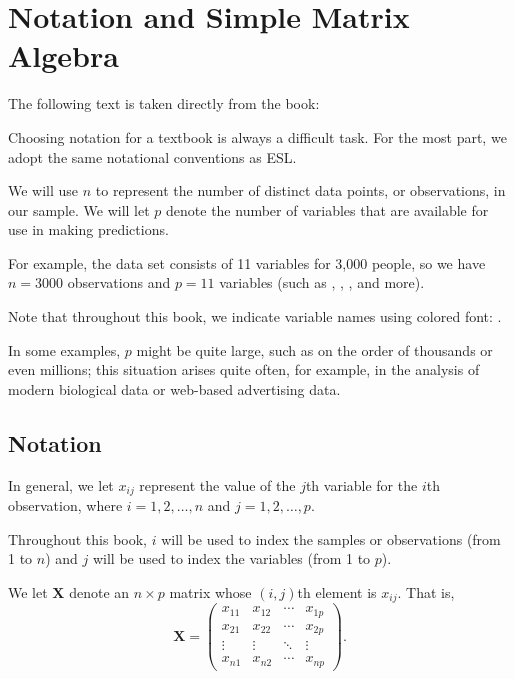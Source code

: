 \section{Notation and Simple Matrix Algebra}
\label{sec:notation}

The following text is taken directly from the book:

Choosing notation for a textbook is always a difficult task. For the most part, we adopt the same notational conventions as ESL. 

We will use \( n \) to represent the number of distinct data points, or observations, in our sample. We will let \( p \) denote the number of variables that are available for use in making predictions. 

For example, the  data set consists of 11 variables for 3,000 people, so we have \( n = 3000 \) observations and \( p = 11 \) variables (such as , , , and more). 

Note that throughout this book, we indicate variable names using colored font: .

In some examples, \( p \) might be quite large, such as on the order of thousands or even millions; this situation arises quite often, for example, in the analysis of modern biological data or web-based advertising data.

\subsection{Notation}

In general, we let \( x_{ij} \) represent the value of the \( j \)th variable for the \( i \)th observation, where \( i = 1, 2, \ldots, n \) and \( j = 1, 2, \ldots, p \). 

Throughout this book, \( i \) will be used to index the samples or observations (from 1 to \( n \)) and \( j \) will be used to index the variables (from 1 to \( p \)).

We let \( \mathbf{X} \) denote an \( n \times p \) matrix whose \( (i,j) \)th element is \( x_{ij} \). That is,
\[
\mathbf{X} = 
\begin{pmatrix}
x_{11} & x_{12} & \cdots & x_{1p} \\
x_{21} & x_{22} & \cdots & x_{2p} \\
\vdots & \vdots & \ddots & \vdots \\
x_{n1} & x_{n2} & \cdots & x_{np}
\end{pmatrix}.
\]

